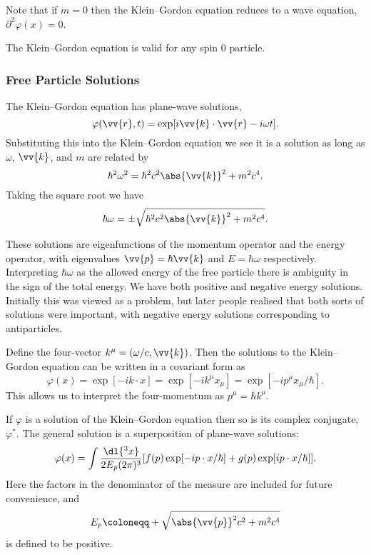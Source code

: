 \documentclass[fleqn]{NotesClass}
\newcommand{\dalembertian}{\partial^2}
\begin{document}
\begin{appendices}
        Note that if \(m = 0\) then the Klein--Gordon equation reduces to a wave equation, \(\dalembertian \varphi(x) = 0\).
        
        The Klein--Gordon equation is valid for any spin 0 particle.
        
        \subsubsection{Free Particle Solutions}
        The Klein--Gordon equation has plane-wave solutions,
        \begin{equation}
            \varphi(\vv{r}, t)  = \exp[i\vv{k} \cdot \vv{r} - i\omega t].
        \end{equation}
        Substituting this into the Klein--Gordon equation we see it is a solution as long as \(\omega\), \(\vv{k}\), and \(m\) are related by
        \begin{equation}
            \hbar^2\omega^2 = \hbar^2c^2\abs{\vv{k}}^2 + m^2c^4.
        \end{equation}
        Taking the square root we have
        \begin{equation}
            \hbar\omega = \pm \sqrt{\hbar^2c^2\abs{\vv{k}}^2 + m^2c^4}.
        \end{equation}
        
        These solutions are eigenfunctions of the momentum operator and the energy operator, with eigenvalues \(\vv{p} = \hbar\vv{k}\) and \(E = \hbar\omega\) respectively.
        Interpreting \(\hbar\omega\) as the allowed energy of the free particle there is ambiguity in the sign of the total energy.
        We have both positive and negative energy solutions.
        Initially this was viewed as a problem, but later people realised that both sorts of solutions were important, with negative energy solutions corresponding to antiparticles.
        
        Define the four-vector \(k^\mu = (\omega/c, \vv{k})\).
        Then the solutions to the Klein--Gordon equation can be written in a covariant form as
        \begin{equation}
            \varphi(x) = \exp[-ik \cdot x] = \exp[-ik^\mu x_\mu] = \exp[-ip^\mu x_\mu/\hbar].
        \end{equation}
        This allows us to interpret the four-momentum as \(p^\mu = \hbar k^\mu\).
        
        If \(\varphi\) is a solution of the Klein--Gordon equation then so is its complex conjugate, \(\varphi^*\).
        The general solution is a superposition of plane-wave solutions:
        \begin{equation}
            \varphi(x) = \int \frac{\dl{^3x}}{2E_p(2\pi)^3}[f(p)\exp[-ip\cdot x/\hbar] + g(p) \exp[ip\cdot x/\hbar]].
        \end{equation}
        Here the factors in the denominator of the measure are included for future convenience, and
        \begin{equation}
            E_p \coloneqq +\sqrt{\abs{\vv{p}}^2c^2 + m^2c^4}
        \end{equation}
        is defined to be positive.
        

\end{appendices}
\end{document}
